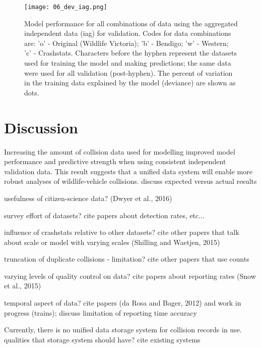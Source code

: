 \begin{figure*}[htp]
  \centering
  \texttt{[image: 06\_dev\_iag.png]}
  \caption[]{Model performance for all combinations of data using the aggregated independent data (iag) for validation. Codes for data combinations are: 'o' - Original (Wildlife Victoria); 'b' - Bendigo; 'w' - Western; 'c' - Crashstats. Characters before the hyphen represent the datasets used for training the model and making predictions; the same data were used for all validation (post-hyphen). The percent of variation in the training data explained by the model (deviance) are shown as dots.}
  \label{val_calib_dev}
\end{figure*}

\section{Discussion}

Increasing the amount of collision data used for modelling improved model performance and predictive strength when using consistent independent validation data. This result suggests that a unified data system will enable more robust analyses of wildlife-vehicle collisions. discuss expected versus actual results

usefulness of citizen-science data? (Dwyer et al., 2016)

survey effort of datasets? cite papers about detection rates, etc...

influence of crashstats relative to other datasets? cite other papers that talk about scale or model with varying scales (Shilling and Waetjen, 2015)

truncation of duplicate collisions - limitation? cite other papers that use counts

varying levels of quality control on data? cite papers about reporting rates (Snow et al., 2015)

temporal aspect of data? cite papers (da Rosa and Bager, 2012) and work in progress (trains); discuss limitation of reporting time accuracy

Currently, there is no unified data storage system for collision records in use. qualities that storage system should have? cite existing systems